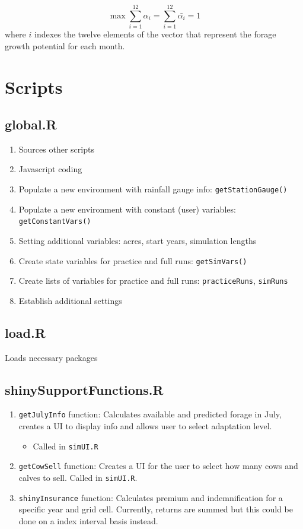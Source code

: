 \documentclass[11pt]{article}
\begin{document}
\begin{equation}
\max \sum_{i=1}^{12} \alpha_{i} = \sum_{i=1}^{12} \bar{\alpha_{i}} = 1 
\end{equation}
where $i$ indexes the twelve elements of the vector that represent the forage growth potential for each month.
\newpage

\section{Scripts}

\subsection{global.R}
\begin{enumerate}
\item Sources other scripts
\item Javascript coding
\item Populate a new environment with rainfall gauge info: \verb!getStationGauge()!
\item Populate a new environment with constant (user) variables: \verb!getConstantVars()!
\item Setting additional variables: acres, start years, simulation lengths
\item Create state variables for practice and full runs: \verb!getSimVars()!
\item Create lists of variables for practice and full runs: \verb!practiceRuns!, \verb!simRuns!
\item Establish additional settings
\end{enumerate}  
 
\subsection{load.R}
Loads necessary packages

\subsection{shinySupportFunctions.R}
\begin{enumerate}
\item \verb!getJulyInfo! function: Calculates available and predicted forage in July, creates a
    UI to display info and allows user to select adaptation level.
    \begin{itemize}
    \item Called in \verb!simUI.R!
    \end{itemize}
\item \verb!getCowSell! function: Creates a UI for the user to select how many cows and calves to sell. Called in \verb!simUI.R!.
\item \verb!shinyInsurance! function: Calculates premium and indemnification for a specific year and grid cell. Currently, returns are summed but this could be done on a index interval basis instead.
\end{enumerate}
\end{document}
